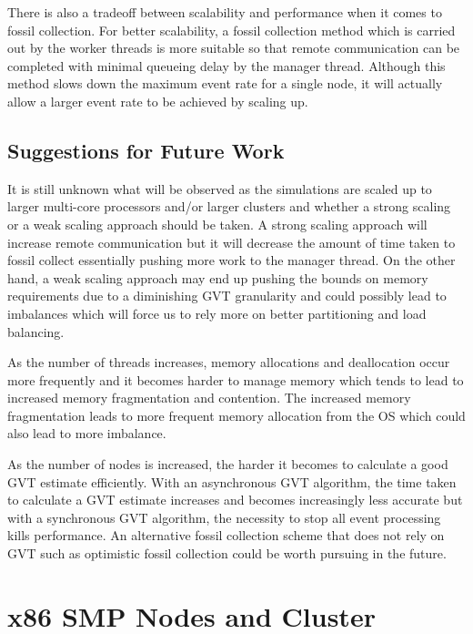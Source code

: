 \documentclass[11pt]{book}
\begin{document}
There is also a tradeoff between scalability and performance when it comes to fossil collection.
For better scalability, a fossil collection method which is carried out by the worker threads is
more suitable so that remote communication can be completed with minimal queueing delay by the
manager thread. Although this method slows down the maximum event rate for a single node, it will
actually allow a larger event rate to be achieved by scaling up.

\section{Suggestions for Future Work}

It is still unknown what will be observed as the simulations are scaled up to larger
multi-core processors and/or larger clusters and whether a strong scaling or a weak scaling
approach should be taken. A strong scaling approach will increase remote communication but
it will decrease the amount of time taken to fossil collect essentially pushing more work to
the manager thread. On the other hand, a weak scaling approach may end up pushing the bounds
on memory requirements due to a diminishing GVT granularity and could possibly lead to imbalances
which will force us to rely more on better partitioning and load balancing.

As the number of threads increases, memory allocations and deallocation occur more frequently
and it becomes harder to manage memory which tends to lead to increased memory fragmentation
and contention. The increased memory fragmentation leads to more frequent memory allocation
from the OS which could also lead to more imbalance. 

As the number of nodes is increased, the harder it becomes to calculate a good GVT estimate
efficiently. With an asynchronous GVT algorithm, the time taken to calculate a GVT estimate
increases and becomes increasingly less accurate but with a synchronous GVT algorithm, the
necessity to stop all event processing kills performance. An alternative fossil collection
scheme that does not rely on GVT such as optimistic fossil collection could be worth pursuing
in the future.

\appendix
\chapter{x86 SMP Nodes and Cluster}\label{x86_nodes_and_clusters}
\end{document}
